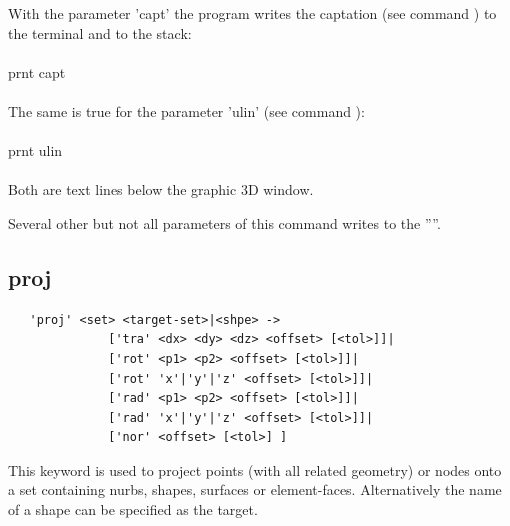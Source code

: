 \documentclass{article}
\begin{document}
With the parameter 'capt' the program writes the captation (see command ) to the terminal and to the stack: \\\\prnt capt\\\\The same is true for the parameter 'ulin' (see command ): \\\\prnt ulin\\\\ Both are text lines below the graphic 3D window.

Several other but not all parameters of this command writes to the ''''.


\subsection{\label{proj}proj}
\begin{verbatim}
   'proj' <set> <target-set>|<shpe> ->
              ['tra' <dx> <dy> <dz> <offset> [<tol>]]|
              ['rot' <p1> <p2> <offset> [<tol>]]|
              ['rot' 'x'|'y'|'z' <offset> [<tol>]]|
              ['rad' <p1> <p2> <offset> [<tol>]]|
              ['rad' 'x'|'y'|'z' <offset> [<tol>]]|
              ['nor' <offset> [<tol>] ]   
\end{verbatim}
This keyword is used to project points (with all related geometry) or nodes onto a set containing nurbs, shapes, surfaces or element-faces. Alternatively the name of a shape can be specified as the target.
\end{document}
